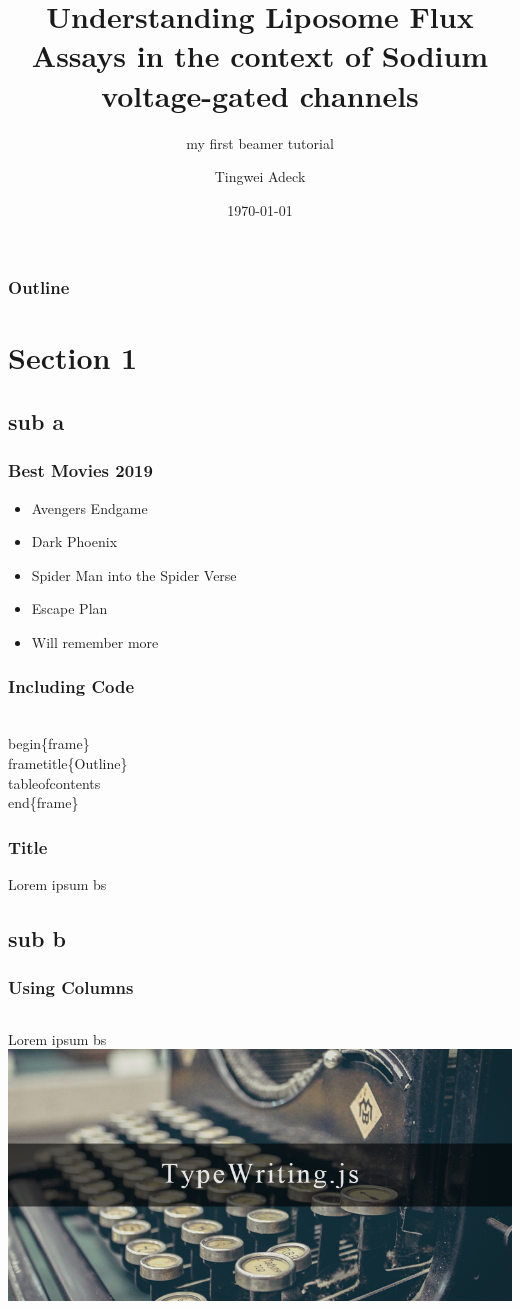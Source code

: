 \documentclass{beamer}
\title{Understanding Liposome Flux Assays in the context of Sodium voltage-gated channels}
\subtitle{my first beamer tutorial}
\author{Tingwei Adeck}
\institute{West Texas A \& M University}
\date{\today}
\begin{document}
\begin{frame}
\titlepage
\end{frame}

\begin{frame}
\label{contents}
\frametitle{Outline}
\tableofcontents
\end{frame}

\section{Section 1}
\subsection{sub a}

\begin{frame}
\label{movies}
\frametitle{Best Movies 2019}
\begin{itemize}
\item Avengers Endgame
\pause
\item Dark Phoenix
\pause
\item Spider Man into the Spider Verse
\pause
\item Escape Plan
\pause
\item Will remember more
\end{itemize}
\end{frame}

\begin{frame}[fragile]
\label{codes}
\frametitle{Including Code}
\begin{semiverbatim}
\\begin\{frame\}
\\frametitle\{Outline\}
\\tableofcontents
\\end\{frame\}
\end{semiverbatim}
\end{frame}

\begin{frame}
\frametitle{Title}
Lorem ipsum bs
\end{frame}

\subsection{sub b}
\begin{frame}
\frametitle{Using Columns}
\begin{columns}
Lorem ipsum bs
\centering
\includegraphics[scale=0.2]{cover.jpg}
\end{columns}
\end{frame}
\end{document}
